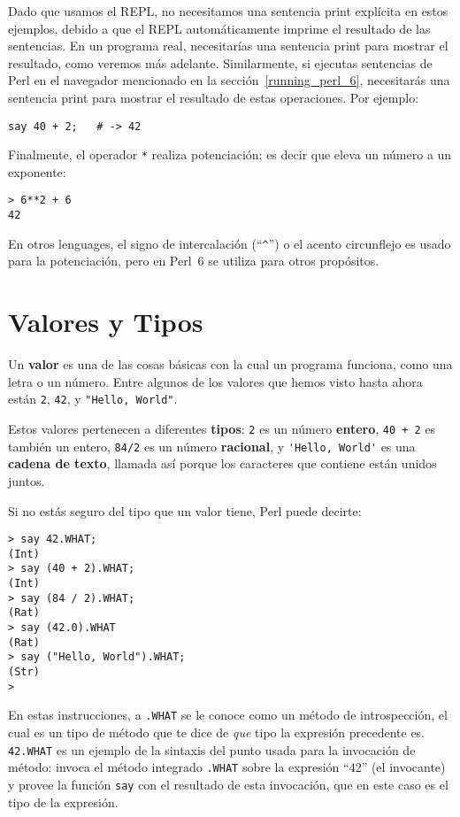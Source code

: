 Dado que usamos el REPL, no necesitamos una sentencia print explícita
en estos ejemplos, debido a que el REPL automáticamente imprime el resultado de las sentencias. En un programa real, necesitarías una sentencia print para mostrar el resultado, como veremos más adelante. Similarmente, si ejecutas sentencias de Perl en el navegador mencionado en la sección~\ref{running_perl_6}, necesitarás una sentencia print para mostrar el resultado de estas operaciones.
Por ejemplo:

\begin{verbatim}
say 40 + 2;   # -> 42
\end{verbatim}


Finalmente, el operador {\tt **} realiza potenciación; es decir que eleva un número a un exponente:

\begin{verbatim}
> 6**2 + 6
42
\end{verbatim}
%
En otros lenguages, el signo de intercalación (``\verb"^"'') o el acento circunflejo es usado para la potenciación, pero en Perl~6 se utiliza para otros propósitos.
%


\section{Valores y Tipos}
\label{values_and_types}

Un {\bf valor} es una de las cosas básicas con la cual un programa funciona,
como una letra o un número. Entre algunos de los valores que hemos visto hasta ahora
están {\tt 2}, {\tt 42}, y \verb'"Hello, World"'.

Estos valores pertenecen a diferentes {\bf tipos}: 
{\tt 2} es un número {\bf entero}, {\tt 40 + 2} es también un entero, 
{\tt 84/2} es un número {\bf racional}, y  \verb"'Hello, World'" es una
{\bf cadena de texto}, llamada así porque los caracteres que contiene están
unidos juntos.

Si no estás seguro del tipo que un valor tiene, Perl puede decirte:

\begin{verbatim}
> say 42.WHAT;
(Int)
> say (40 + 2).WHAT;
(Int)
> say (84 / 2).WHAT;
(Rat)
> say (42.0).WHAT
(Rat)
> say ("Hello, World").WHAT;
(Str)
>
\end{verbatim}
%
En estas instrucciones, a {\tt .WHAT} se le conoce como un método 
de introspección, el cual es un tipo de método que te dice de \emph{que}
tipo la expresión precedente es. {\tt 42.WHAT} es un ejemplo de la sintaxis 
del punto usada para la invocación de método: invoca el método integrado
{\tt .WHAT} sobre la expresión ``42'' (el invocante) y provee la función {\tt say}
con el resultado de esta invocación, que en este caso es el tipo de la expresión.

